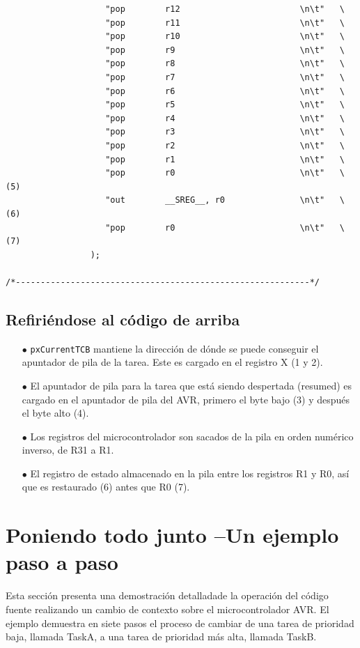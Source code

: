 \documentclass[12pt]{article}
\begin{document}
\begin{verbatim}
                    "pop        r12                        \n\t"   \
                    "pop        r11                        \n\t"   \
                    "pop        r10                        \n\t"   \
                    "pop        r9                         \n\t"   \
                    "pop        r8                         \n\t"   \
                    "pop        r7                         \n\t"   \
                    "pop        r6                         \n\t"   \
                    "pop        r5                         \n\t"   \
                    "pop        r4                         \n\t"   \
                    "pop        r3                         \n\t"   \
                    "pop        r2                         \n\t"   \
                    "pop        r1                         \n\t"   \
                    "pop        r0                         \n\t"   \ (5)
                    "out        __SREG__, r0               \n\t"   \ (6)
                    "pop        r0                         \n\t"   \ (7)
                 );

/*-----------------------------------------------------------*/
\end{verbatim}
\subsection*{Ref\/iriéndose al código de arriba}
\begin{itemize}
\item[$\bullet$] {\tt pxCurrentTCB} mantiene la dirección de dónde se puede 
conseguir el apuntador de pila de la tarea. Este es cargado en el registro 
X  (1 y 2).
\item[$\bullet$] El apuntador de pila para la tarea que está siendo despertada 
(resumed) es cargado en el apuntador de pila del AVR, primero el byte bajo (3) 
y después el byte alto (4).
\item[$\bullet$] Los registros del microcontrolador son sacados de la pila 
en orden numérico inverso, de R31 a R1.
\item[$\bullet$] El registro de estado almacenado en la pila entre los registros 
R1 y R0, así que es restaurado (6) antes que R0 (7).
\end{itemize}
\section{Poniendo todo junto --Un ejemplo paso a paso}
Esta sección presenta una demostración detalladade la operación del código fuente 
realizando un cambio de contexto sobre el microcontrolador AVR. El ejemplo 
demuestra en siete pasos el proceso de cambiar de una tarea de prioridad baja, 
llamada TaskA, a una tarea de prioridad más alta, llamada TaskB.
\end{document}
